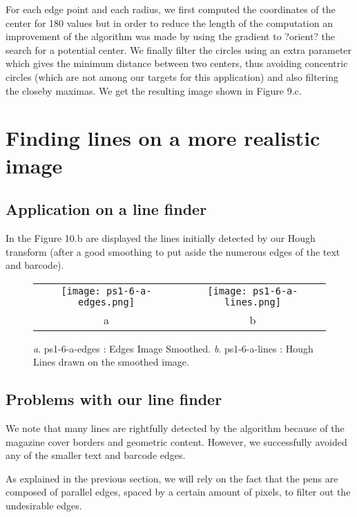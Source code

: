 \documentclass[a4paper,11pt]{article}
\begin{document}
For each edge point and each radius, we first computed the coordinates of the center for 180 values but in order to reduce the length of the computation an improvement of the algorithm was made by using the gradient to ?orient? the search for a potential center.
We finally filter the circles using an extra parameter which gives the minimum distance between two centers, thus avoiding concentric circles (which are not among our targets for this application) and also filtering the closeby maximas.
We get the resulting image shown in Figure 9.c.

\section{Finding lines on a more realistic image}

\subsection{Application on a line finder}


In the Figure 10.b are displayed the lines initially detected by our Hough transform (after a good smoothing to put aside the numerous edges of the text and barcode).

 \begin{figure}[H]
\begin{center}
\begin{tabular}{cc}
\texttt{[image: ps1-6-a-edges.png]}&
\texttt{[image: ps1-6-a-lines.png]}\\
	a&b
\end{tabular}
\end{center}
 \caption{
\textit{a}. ps1-6-a-edges : Edges Image Smoothed.  \textit{b}. ps1-6-a-lines : Hough Lines drawn on the smoothed image.}
\label{ps1-6}
\end{figure}

\subsection{Problems with our line finder}

We note that many lines are rightfully detected by the algorithm because of the magazine cover borders and geometric content. However, we successfully avoided any of the smaller text and barcode edges.

As explained in the previous section, we will rely on the fact that the pens are composed of parallel edges, spaced by a certain amount of pixels, to filter out the undesirable edges.
\end{document}
